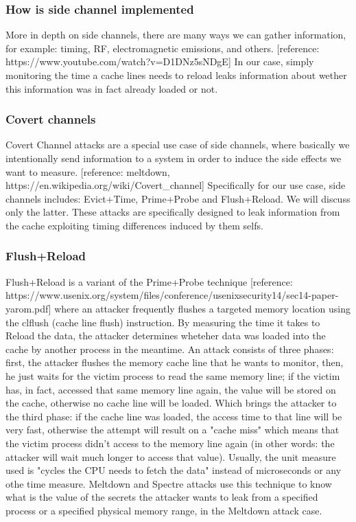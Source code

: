 \subsubsection{How is side channel implemented}
More in depth on side channels, there are many ways we can gather information, for example: timing, RF, electromagnetic emissions, and others.
[reference: https://www.youtube.com/watch?v=D1DNz5sNDgE]
In our case, simply monitoring the time a cache lines needs to reload leaks information about wether this information was in fact already loaded or not.

\subsubsection{Covert channels}
Covert Channel attacks are a special use case of side channels, where basically we intentionally send information
to a system in order to induce the side effects we want to measure.
[reference: meltdown, https://en.wikipedia.org/wiki/Covert\_channel]
Specifically for our use case, side channels includes: Evict+Time, Prime+Probe and Flush+Reload. We will discuss only the latter.
These attacks are specifically designed to leak information from the cache exploiting timing differences induced by them selfs.

\subsubsection{Flush+Reload}
Flush+Reload is a variant of the Prime+Probe technique [reference: https://www.usenix.org/system/files/conference/usenixsecurity14/sec14-paper-yarom.pdf] where an attacker
frequently flushes a targeted memory location using the clflush (cache line flush) instruction. By measuring the time it takes to Reload
the data, the attacker determines wheteher data was loaded into the cache by another process in the meantime.
An attack consists of three phases: first, the attacker flushes the memory cache line that he wants to monitor, then, he just waits for the victim process to read the same
memory line; if the victim has, in fact, accessed that same memory line again, the value will be stored on the cache, otherwise no cache line will be loaded. Which brings
the attacker to the third phase: if the cache line was loaded, the access time to that line will be very fast, otherwise the attempt will result on a "cache miss" which
means that the victim process didn't access to the memory line again (in other words: the attacker will wait much longer to access that value). Usually, the unit measure
used is "cycles the CPU needs to fetch the data" instead of microseconds or any othe time measure.
Meltdown and Spectre attacks use this technique to know what is the value of the secrets the attacker wants to leak from a specified process or a specified physical memory range, in the Meltdown attack case.

